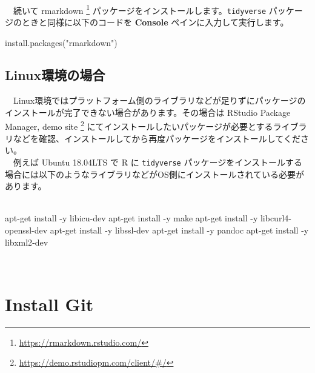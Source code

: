 \documentclass[
  12pt,
]{book}
\newenvironment{Shaded}{\begin{snugshade}}{\end{snugshade}}
\newcommand{\AttributeTok}[1]{\textcolor[rgb]{0.77,0.63,0.00}{#1}}
\newcommand{\ExtensionTok}[1]{#1}
\newcommand{\FunctionTok}[1]{\textcolor[rgb]{0.00,0.00,0.00}{#1}}
\newcommand{\NormalTok}[1]{#1}
\newcommand{\StringTok}[1]{\textcolor[rgb]{0.31,0.60,0.02}{#1}}
\DeclareRobustCommand{\href}[2]{#2\footnote{\url{#1}}}
\begin{document}
　

　続いて \href{https://rmarkdown.rstudio.com/}{rmarkdown } パッケージをインストールします。\texttt{tidyverse} パッケージのときと同様に以下のコードを \textbf{Console} ペインに入力して実行します。

\begin{Shaded}
\begin{Highlighting}[numbers=left,,]
\FunctionTok{install.packages}\NormalTok{(}\StringTok{"rmarkdown"}\NormalTok{)}
\end{Highlighting}
\end{Shaded}

\hypertarget{linuxux74b0ux5883ux306eux5834ux5408}{%
\subsection{Linux環境の場合}\label{linuxux74b0ux5883ux306eux5834ux5408}}

　Linux環境ではプラットフォーム側のライブラリなどが足りずにパッケージのインストールが完了できない場合があります。その場合は \href{https://demo.rstudiopm.com/client/\#/}{RStudio Package Manager, demo site } にてインストールしたいパッケージが必要とするライブラリなどを確認、インストールしてから再度パッケージをインストールしてください。\\
　例えば Ubuntu 18.04LTS で R に \texttt{tidyverse} パッケージをインストールする場合には以下のようなライブラリなどがOS側にインストールされている必要があります。\\
　

\begin{Shaded}
\begin{Highlighting}[numbers=left,,]
\ExtensionTok{apt{-}get}\NormalTok{ install }\AttributeTok{{-}y}\NormalTok{ libicu{-}dev}
\ExtensionTok{apt{-}get}\NormalTok{ install }\AttributeTok{{-}y}\NormalTok{ make}
\ExtensionTok{apt{-}get}\NormalTok{ install }\AttributeTok{{-}y}\NormalTok{ libcurl4{-}openssl{-}dev}
\ExtensionTok{apt{-}get}\NormalTok{ install }\AttributeTok{{-}y}\NormalTok{ libssl{-}dev}
\ExtensionTok{apt{-}get}\NormalTok{ install }\AttributeTok{{-}y}\NormalTok{ pandoc}
\ExtensionTok{apt{-}get}\NormalTok{ install }\AttributeTok{{-}y}\NormalTok{ libxml2{-}dev}
\end{Highlighting}
\end{Shaded}

　

\hypertarget{install-git}{%
\section{Install Git}\label{install-git}}
\end{document}
